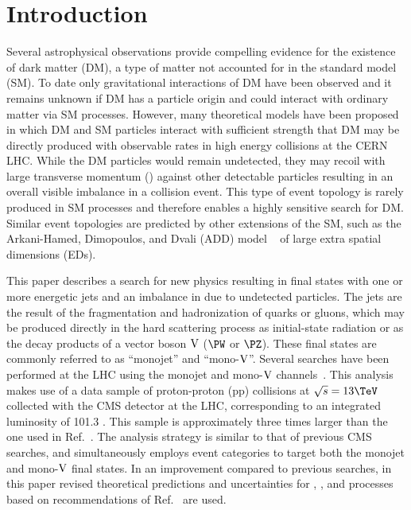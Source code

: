 \section{Introduction} \label{section:introduction}

Several astrophysical observations \cite{Bertone:2004pz,Feng:2010gw,Porter:2011nv} 
provide compelling evidence for the existence of
dark matter (DM), a type of matter not accounted for in the standard model (SM).
To date only gravitational interactions of DM have been observed and it remains unknown
if DM has a particle origin and could interact with ordinary matter via SM processes. However,
many theoretical models have been proposed in which DM and SM
particles interact with sufficient strength that DM may be directly produced with
observable rates in high energy collisions at the CERN LHC.
While the DM particles would remain undetected, they may recoil
with large transverse momentum (\pt) against other detectable particles
resulting in an overall visible \pt imbalance in a collision event. This type of event topology is
rarely produced in SM processes and therefore enables a highly sensitive search 
for DM. Similar event topologies are predicted by other extensions of the SM, 
such as the Arkani-Hamed, Dimopoulos, and Dvali (ADD)
model ~\cite{bib:ADD1,ADDPRD,Antoniadis,ADDGiudice,ADDPeskin} of large extra spatial dimensions (EDs).

This paper describes a search for new physics resulting in final
states with one or more energetic jets and an imbalance in \pt
due to undetected particles. The jets are the result of the fragmentation and hadronization of
quarks or gluons, which may be produced directly in the hard scattering process as initial-state radiation or
as the decay products of a vector boson $\mathrm{V}$ ($\PW$ or $\PZ$).
These final states are commonly referred to as ``monojet'' and ``mono-$\mathrm{V}$''.
Several searches have been performed at the LHC using the
monojet and mono-$\mathrm{V}$ channels~\cite{Aad:2013oja,Khachatryan:2014rra,Aad:2015zva,Khachatryan:2016mdm,Aaboud:2016tnv,paper-exo-037,Aaboud:2017phn}.
This analysis makes use of a data sample of proton-proton
(pp) collisions at $\sqrt{s}=13\TeV$ collected with the
CMS detector at the LHC, corresponding to an integrated
luminosity of 101.3 \fbinv. This sample is approximately
three times larger than the one used in Ref.~\cite{Sirunyan:2017jix}.
The analysis strategy is similar to that of previous CMS searches, and simultaneously
employs event categories to target both the monojet and mono-$\mathrm{V}$ final states.
In an improvement compared to previous searches, in this paper revised theoretical predictions and uncertainties
for \phojets, \Zjets, and \Wjets processes based on recommendations of Ref.~\cite{DMTheory} are used.
